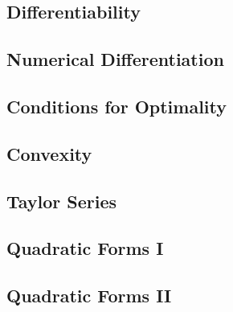 


\subsection{Differentiability}


\subsection{Numerical Differentiation}


\subsection{Conditions for Optimality}


\subsection{Convexity}


\subsection{Taylor Series}


\subsection{Quadratic Forms I}


\subsection{Quadratic Forms II}


